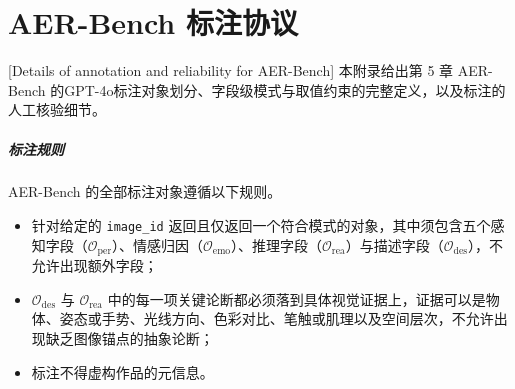 \chapter{AER-Bench 标注协议}[Details of annotation and reliability for AER-Bench]
\label{app:aerbench_supplement}
本附录给出第 5 章 AER-Bench 的GPT-4o标注对象划分、字段级模式与取值约束的完整定义，以及标注的人工核验细节。




\label{app:annotation_protocol}


\paragraph{标注规则}
AER-Bench 的全部标注对象遵循以下规则。
\begin{itemize}
    \item 针对给定的 \texttt{image\_id} 返回且仅返回一个符合模式的对象，其中须包含五个感知字段（$\mathcal{O}_{\text{per}}$）、情感归因（$\mathcal{O}_{\text{emo}}$）、推理字段（$\mathcal{O}_{\text{rea}}$）与描述字段（$\mathcal{O}_{\text{des}}$），不允许出现额外字段；
    \item $\mathcal{O}_{\text{des}}$ 与 $\mathcal{O}_{\text{rea}}$ 中的每一项关键论断都必须落到具体视觉证据上，证据可以是物体、姿态或手势、光线方向、色彩对比、笔触或肌理以及空间层次，不允许出现缺乏图像锚点的抽象论断；
    \item 标注不得虚构作品的元信息。
\end{itemize}


